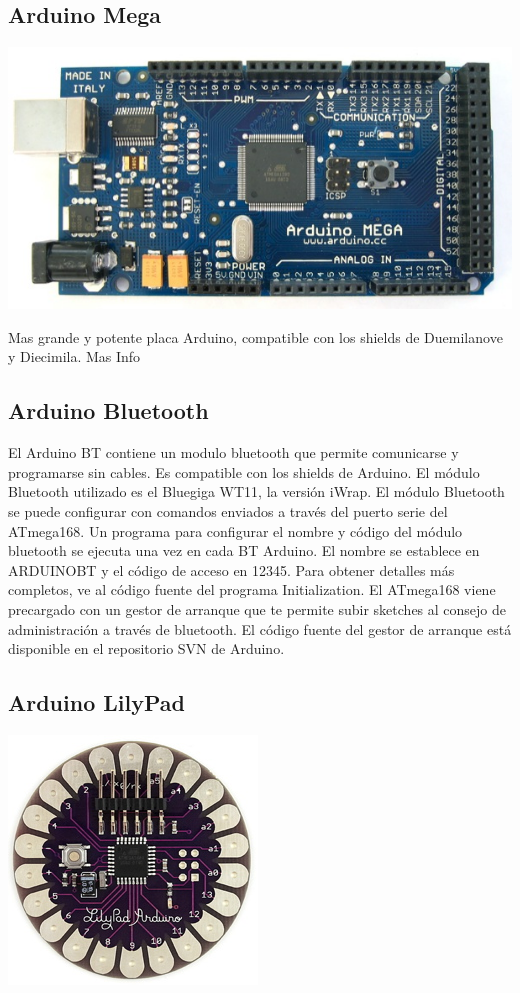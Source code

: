 \documentclass[12pt,a4paper]{report}
\begin{document}
\subsection{Arduino Mega}

\includegraphics[scale=0.6]{ArduinoMega.jpg}

Mas grande y potente placa Arduino, compatible con los shields de Duemilanove y Diecimila. Mas Info

\subsection{Arduino Bluetooth}

El Arduino BT contiene un modulo bluetooth que permite comunicarse y programarse sin cables. Es compatible con los shields de Arduino. 
El módulo Bluetooth utilizado es el Bluegiga WT11, la versión iWrap. El módulo Bluetooth se puede configurar con comandos enviados a través del puerto serie del ATmega168. Un programa para configurar el nombre y código del módulo bluetooth se ejecuta una vez en cada BT Arduino. El nombre se establece en ARDUINOBT y el código de acceso en 12345. Para obtener detalles más completos, ve al código fuente del programa Initialization. El ATmega168 viene precargado con un gestor de arranque que te permite subir sketches al consejo de administración a través de bluetooth. El código fuente del gestor de arranque está disponible en el repositorio SVN de Arduino.

\subsection{Arduino LilyPad}

\includegraphics[scale=0.6]{LilyPad_3.jpg}
\end{document}
